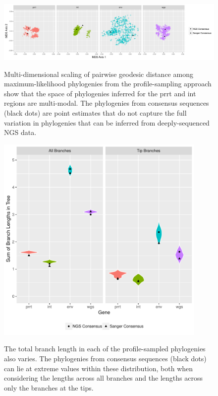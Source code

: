\documentclass[letterpaper]{article}
\begin{document}
\begin{figure}[p!]
	\caption{Multi-dimensional scaling of pairwise geodesic distance among maximum-likelihood phylogenies from the profile-sampling approach show that the space of phylogenies inferred for the prrt and int regions are multi-modal. The phylogenies from consensus sequences (black dots) are point estimates that do not capture the full variation in phylogenies that can be inferred from deeply-sequenced NGS data.}
	\centering
	\includegraphics[width=\linewidth]{Figure2}
	\label{fig2}
\end{figure}
	
\begin{figure}[p!]
	\caption{The total branch length in each of the profile-sampled phylogenies also varies. The phylogenies from consensus sequences (black dots) can lie at extreme values within these distribution, both when considering the lengths across all branches and the lengths across only the branches at the tips.}
	\centering
	\includegraphics[width=4in]{Figure3}
	\label{fig3}
\end{figure}
\end{document}
